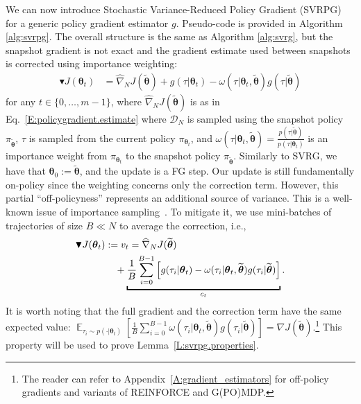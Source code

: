 \documentclass{article}
\makeatletter
\theoremstyle{remark}
\theoremstyle{definition}
\DeclareRobustCommand{\eg}{e.g.,\@\xspace}
\DeclareRobustCommand{\ie}{i.e.,\@\xspace}
\DeclareMathOperator*{\EV}{\mathbb{E}}
\newcommand{\EVV}[2][\ppvect \in \ppspace]{\EV_{#1}\left[{#2}\right]}
\newcommand{\vtheta}{\boldsymbol{\theta}}
\newcommand{\Reward}{\mathcal{R}}
\newcommand{\wt}[1]{\widetilde{#1}}
\newcommand{\wh}[1]{\widehat{#1}}
\makeatother
\begin{document}
We can now introduce Stochastic Variance-Reduced Policy Gradient (SVRPG) for a generic policy gradient estimator $g$. Pseudo-code is provided in Algorithm \ref{alg:svrpg}.
The overall structure is the same as Algorithm \ref{alg:svrg}, 
but the snapshot gradient is not exact and the gradient estimate used between snapshots is corrected using importance weighting:
\begin{align*}
        \blacktriangledown J(\vtheta_{t}) &= \wh{\nabla}_N J(\wt{\vtheta}) + g(\tau|\vtheta_t) - \omega(\tau|\vtheta_t, \wt{\vtheta}) g(\tau|\wt{\vtheta})
\end{align*}
for any $t \in \{0,\ldots,m-1\}$,
where $\wh{\nabla}_N J(\wt{\vtheta})$ is as in Eq.~\eqref{E:policygradient.estimate} where $\mathcal{D}_N$ is sampled using the snapshot policy $\pi_{\wt{\vtheta}}$, $\tau$ is sampled from the current policy $\pi_{\vtheta_t}$, and $\omega(\tau|\vtheta_t, \wt{\vtheta}) = \frac{p(\tau|\wt{\vtheta})}{p(\tau|\vtheta_t)}$ is an importance weight from $\pi_{\vtheta_t}$ to the snapshot policy $\pi_{\wt{\vtheta}}$. 
Similarly to SVRG, we have that $\vtheta_0 := \wt{\vtheta}$, and the update is a FG step.
Our update is still fundamentally on-policy since the weighting concerns only the correction term. However, this partial ``off-policyness'' represents an additional source of variance. This is a well-known issue of importance sampling~\citep[\eg][]{thomas2015high}. To mitigate it, we use mini-batches of trajectories of size $B \ll N$ to average the correction, \ie
\begin{align}\label{E:svrpg.estimate.batch}
        \blacktriangledown J(\vtheta_{t}) &:= v_t= \wh{\nabla}_N J(\wt{\vtheta})\\ \notag
                                            & \quad{} + 
        \underbracket{
        \frac{1}{B} \sum_{i=0}^{B-1} \left[
        g(\tau_i|\vtheta_t) - \omega(\tau_i|\vtheta_t, \wt{\vtheta}) g(\tau_i|\wt{\vtheta})
\right]}_{c_t}.
\end{align}
It is worth noting that the full gradient and the correction term have the same expected value: $\EVV[\tau_i \sim p(\cdot|\vtheta_t)]{\frac{1}{B} \sum_{i=0}^{B-1} \omega(\tau_i|\vtheta_t, \wt{\vtheta}) g(\tau_i|\wt{\vtheta})} = \nabla J(\wt{\vtheta})$.\footnote{The reader can refer to Appendix~\ref{A:gradient_estimators} for off-policy gradients and variants of REINFORCE and G(PO)MDP.}
This property will be used to prove Lemma~\ref{L:svrpg.properties}.
\end{document}
